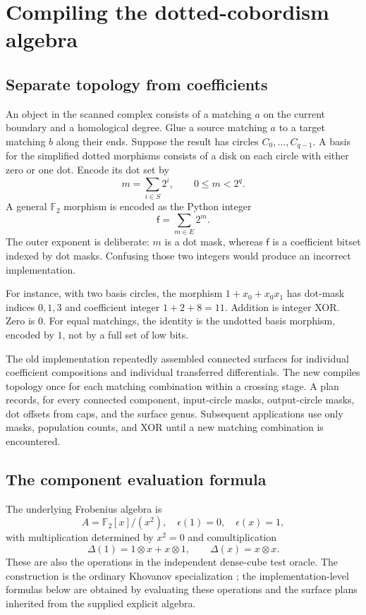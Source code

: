 \documentclass[11pt]{article}
\newcommand{\F}{\mathbb F}
\newcommand{\code}[1]{\texttt{\detokenize{#1}}}
\begin{document}
\section{Compiling the dotted-cobordism algebra}

\subsection{Separate topology from coefficients}

An object in the scanned complex consists of a matching $a$ on the current
boundary and a homological degree. Glue a source matching $a$ to a target
matching $b$ along their ends. Suppose the result has circles
$C_0,\ldots,C_{q-1}$. A basis for the simplified dotted morphisms consists of a
disk on each circle with either zero or one dot. Encode its dot set by
\[
 m=\sum_{i\in S}2^i,\qquad 0\leq m<2^q.
\]
A general $\F_2$ morphism is encoded as the Python integer
\[
 \mathsf{f}=\sum_{m\in E}2^m.
\]
The outer exponent is deliberate: $m$ is a dot mask, whereas $\mathsf f$ is a
coefficient bitset indexed by dot masks. Confusing those two integers would
produce an incorrect implementation.

For instance, with two basis circles, the morphism $1+x_0+x_0x_1$ has dot-mask
indices $0,1,3$ and coefficient integer $1+2+8=11$. Addition is integer XOR.
Zero is $0$. For equal matchings, the identity is the undotted basis morphism,
encoded by $1$, not by a full set of low bits.

The old implementation repeatedly assembled connected surfaces for individual
coefficient compositions and individual transferred differentials. The new
\code{Algebra} compiles topology once for each matching combination within a
crossing stage. A plan records, for every connected component, input-circle
masks, output-circle masks, dot offsets from caps, and the surface genus.
Subsequent applications use only masks, population counts, and XOR until a new
matching combination is encountered.

\subsection{The component evaluation formula}

The underlying Frobenius algebra is
\[
 A=\F_2[x]/(x^2),\quad
 \epsilon(1)=0,\quad\epsilon(x)=1,
\]
with multiplication determined by $x^2=0$ and comultiplication
\[
 \Delta(1)=1\otimes x+x\otimes1,
 \qquad \Delta(x)=x\otimes x.
\]
These are also the operations in the independent dense-cube test oracle.
The construction is the ordinary Khovanov specialization
\cite{khovanov}; the implementation-level formulas below are obtained by
evaluating these operations and the surface plans inherited from the supplied
explicit algebra.
\end{document}
